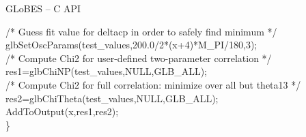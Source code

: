 \documentclass[pdf,ps2pdf,azure,slideColor,colorBG]{prosper}
\begin{document}
{\begin{slide}{GLoBES -- C API}
{{\begin{minipage}{12cm}
{{ /* Guess fit value for deltacp in order to safely find minimum */ \\
 glbSetOscParams(test\_values,200.0/2*(x+4)*M\_PI/180,3); \\
 
 /* Compute Chi2 for user-defined two-parameter correlation */ \\
 res1=glbChiNP(test\_values,NULL,GLB\_ALL); \\
     
 /* Compute Chi2 for full correlation: minimize over all but theta13 */ \\
 res2=glbChiTheta(test\_values,NULL,GLB\_ALL); \\
 
 AddToOutput(x,res1,res2);\\
  \}   
}}
\end{minipage}
}}
\end{slide}}
\end{document}
